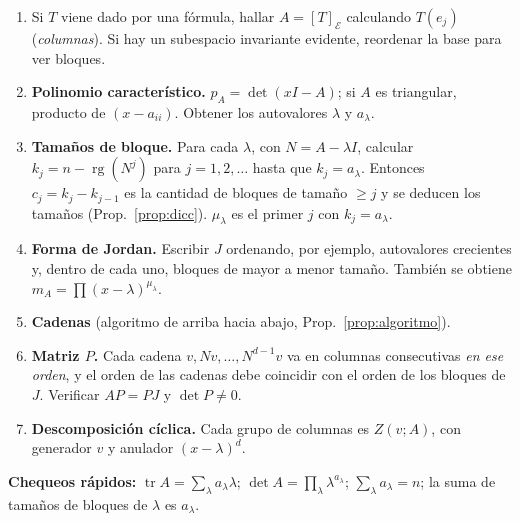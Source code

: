 \documentclass{article}
\DeclareMathOperator{\rg}{rg}
\DeclareMathOperator{\tr}{tr}
\theoremstyle{plain}
\theoremstyle{definition}
\theoremstyle{remark}
\begin{document}
\begin{enumerate}[label=\textbf{Paso \arabic*.},leftmargin=*,itemsep=3pt]
    \item[\textbf{Paso 0.}] Si \(T\) viene dado por una fórmula, hallar \(A=[T]_{\mathcal E}\) calculando \(T(e_j)\) (\emph{columnas}). Si hay un subespacio invariante evidente, reordenar la base para ver bloques.
    \item \textbf{Polinomio característico.} \(p_A=\det(xI-A)\); si \(A\) es triangular, producto de \((x-a_{ii})\). Obtener los autovalores \(\lambda\) y \(a_\lambda\).
    \item \textbf{Tamaños de bloque.} Para cada \(\lambda\), con \(N=A-\lambda I\), calcular \(k_j=n-\rg(N^j)\) para \(j=1,2,\dots\) hasta que \(k_j=a_\lambda\). Entonces \(c_j=k_j-k_{j-1}\) es la cantidad de bloques de tamaño \(\ge j\) y se deducen los tamaños (Prop.~\ref{prop:dicc}). \(\mu_\lambda\) es el primer \(j\) con \(k_j=a_\lambda\).
    \item \textbf{Forma de Jordan.} Escribir \(J\) ordenando, por ejemplo, autovalores crecientes y, dentro de cada uno, bloques de mayor a menor tamaño. También se obtiene \(m_A=\prod(x-\lambda)^{\mu_\lambda}\).
    \item \textbf{Cadenas} (algoritmo de arriba hacia abajo, Prop.~\ref{prop:algoritmo}).
    \item \textbf{Matriz \(P\).} Cada cadena \(v,Nv,\dots,N^{d-1}v\) va en columnas consecutivas \emph{en ese orden}, y el orden de las cadenas debe coincidir con el orden de los bloques de \(J\). Verificar \(AP=PJ\) y \(\det P\ne0\).
    \item \textbf{Descomposición cíclica.} Cada grupo de columnas es \(Z(v;A)\), con generador \(v\) y anulador \((x-\lambda)^d\).
\end{enumerate}

\textbf{Chequeos rápidos:} \(\tr A=\sum_\lambda a_\lambda\lambda\); \(\det A=\prod_\lambda\lambda^{a_\lambda}\); \(\sum_\lambda a_\lambda=n\); la suma de tamaños de bloques de \(\lambda\) es \(a_\lambda\).
\end{document}
